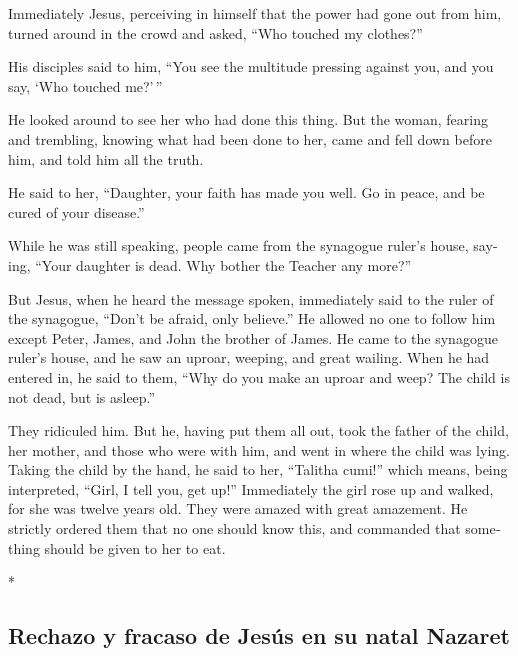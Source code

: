 \begin{paracol}{2}
\begin{otherlanguage}{english}
 Immediately Jesus, perceiving in himself that the power
had gone out from him, turned around in the crowd and asked, ``Who
touched my clothes?''

 His disciples said to him, ``You see the multitude
pressing against you, and you say, `Who touched me?'\,''

 He looked around to see her who had done this thing.
 But the woman, fearing and trembling, knowing what had
been done to her, came and fell down before him, and told him all the
truth.

 He said to her, ``Daughter, your faith has made you
well. Go in peace, and be cured of your disease.''

 While he was still speaking, people came from the
synagogue ruler's house, saying, ``Your daughter is dead. Why bother the
Teacher any more?''

 But Jesus, when he heard the message spoken, immediately
said to the ruler of the synagogue, ``Don't be afraid, only believe.''
 He allowed no one to follow him except Peter, James, and
John the brother of James.  He came to the synagogue
ruler's house, and he saw an uproar, weeping, and great wailing.
 When he had entered in, he said to them, ``Why do you
make an uproar and weep? The child is not dead, but is asleep.''

 They ridiculed him. But he, having put them all out,
took the father of the child, her mother, and those who were with him,
and went in where the child was lying.  Taking the child
by the hand, he said to her, ``Talitha cumi!'' which means, being
interpreted, ``Girl, I tell you, get up!''  Immediately
the girl rose up and walked, for she was twelve years old. They were
amazed with great amazement.  He strictly ordered them
that no one should know this, and commanded that something should be
given to her to eat.

\end{otherlanguage}

\switchcolumn[0]*

\hypertarget{rechazo-y-fracaso-de-jesuxfas-en-su-natal-nazaret}{%
\subsection{Rechazo y fracaso de Jesús en su natal
Nazaret}\label{rechazo-y-fracaso-de-jesuxfas-en-su-natal-nazaret}}


\end{paracol}
